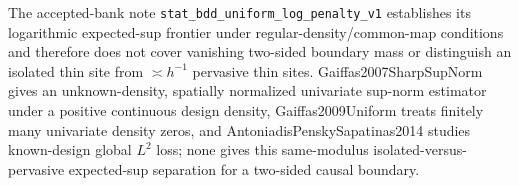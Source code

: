 The accepted-bank note \texttt{stat\_bdd\_uniform\_log\_penalty\_v1} establishes its logarithmic expected-sup frontier under regular-density/common-map conditions and therefore does not cover vanishing two-sided boundary mass or distinguish an isolated thin site from \(\asymp h^{-1}\) pervasive thin sites. Gaiffas2007SharpSupNorm gives an unknown-density, spatially normalized univariate sup-norm estimator under a positive continuous design density, Gaiffas2009Uniform treats finitely many univariate density zeros, and AntoniadisPenskySapatinas2014 studies known-design global \(L^2\) loss; none gives this same-modulus isolated-versus-pervasive expected-sup separation for a two-sided causal boundary.